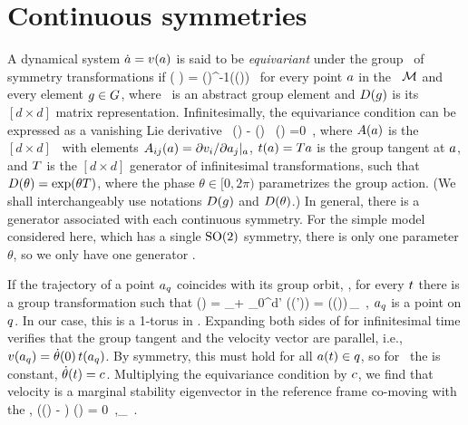 \section{Continuous symmetries}
\label{s:symm}

A dynamical system $\dot{a}={v}(a)$ is said to be
\emph{equivariant} under the group \Group\ of symmetry transformations if
\beq
   \vel( \ssp )
    =  \matrixRep(\LieEl)^{-1}\vel(\matrixRep(\LieEl)\ssp)
   \,
for every point $a$ in the \statesp\ ${\cal M}$ and every element $g \in
G$, where \LieEl\ is an abstract group element and
${D}(g)$ is its $[d\!\times\!d]$ matrix representation.
Infinitesimally, the equivariance condition  can be expressed as
a vanishing Lie derivative
\beq
  \Lg \, \vel(\ssp)  - \Mvar(\ssp) \, \groupTan(\ssp) =0
  \,,
where
${A}(a)$ is the $[d\!\times\!d]$ \stabmat\, with elements
${A}_{ij}(a)={\partial {v}_i}/{\partial a_j}|_{a}$, $ t(a)
= {T} a $ is the group tangent at $a$, and ${T}$ is the
$[d\!\times\!d]$ generator of infinitesimal transformations, such that
${D}(\theta) = \exp(\theta{T})$, where the phase $\theta \in [0,2\pi)$
parametrizes the group action. (We shall interchangeably use notations
${D}(g)$ and ${D}(\theta)$.) In general, there is a
generator associated with each continuous symmetry. For the simple model
considered here, which has a single $\textrm{SO}(2)$ symmetry, there is only one
parameter $\theta$, so we only have one generator \Lg.

If the trajectory of a point $a_q$ coincides with its group
orbit, \ie, for every $t$ there is a group transformation such that
\beq
\ssp (\zeit)
    = \ssp_\stagn + \int_0^\zeit \!\!d\zeit' \vel(\ssp (\zeit'))
    = \matrixRep(\theta (\zeit))\,\ssp_\stagn
  \,,
$a_q$ is a point on \emph{\reqv} $q$. In our case, this is a
1-torus in \statesp. Expanding both sides of  for infinitesimal time
verifies that the group tangent and the velocity vector are parallel, i.e.,
 ${v}(a_q) = \dot{\theta}(0) \, t(a_q)$.
By symmetry, this must hold for all $a(t) \in q$, so for \reqva\
the \emph{\phaseVel} is constant, $\dot{\theta}(t) = c$.
Multiplying the equivariance condition \refeq{inftmInv} by $c$, we
find that velocity is a marginal stability eigenvector in the reference frame co-moving
with the \reqv,
\beq
(\Mvar (\ssp) - \velRel \Lg) \vel (\ssp) = 0
\,,\qquad \ssp \in \pS_\stagn
\,.

